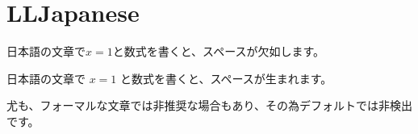 \section{LLJapanese}

\begin{CJK}{UTF8}{ipxm}
	日本語の文章で$x=1$と数式を書くと、スペースが欠如します。

	日本語の文章で $x=1$ と数式を書くと、スペースが生まれます。

	尤も、フォーマルな文章では非推奨な場合もあり、その為デフォルトでは非検出です。
\end{CJK}
